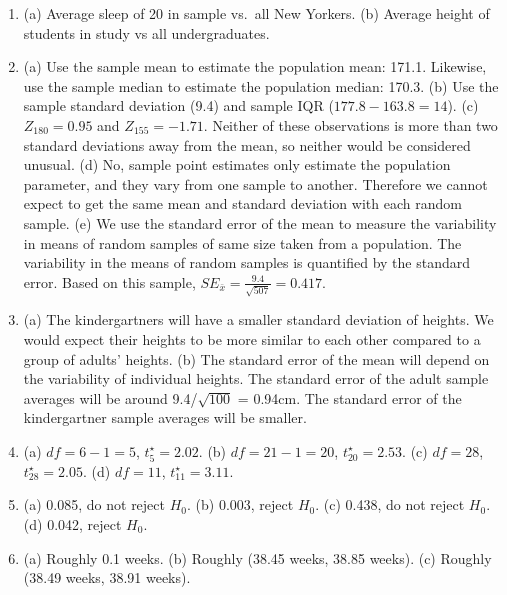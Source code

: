 \documentclass[
  10pt,
  openany]{book}
\providecommand{\tightlist}{%
  \setlength{\itemsep}{0pt}\setlength{\parskip}{0pt}}
\begin{document}
\begin{enumerate}
\def\labelenumi{\arabic{enumi}.}
\tightlist
\item
  (a) Average sleep of 20 in sample vs.~all New Yorkers. (b) Average height of students in study vs all undergraduates.

  \addtocounter{enumi}{1}
\item
  (a) Use the sample mean to estimate the population mean: 171.1. Likewise, use the sample median to estimate the population median: 170.3. (b) Use the sample standard deviation (9.4) and sample IQR (\(177.8-163.8 = 14\)). (c) \(Z_{180} = 0.95\) and \(Z_{155} = -1.71.\) Neither of these observations is more than two standard deviations away from the mean, so neither would be considered unusual. (d) No, sample point estimates only estimate the population parameter, and they vary from one sample to another. Therefore we cannot expect to get the same mean and standard deviation with each random sample. (e) We use the standard error of the mean to measure the variability in means of random samples of same size taken from a population. The variability in the means of random samples is quantified by the standard error. Based on this sample, \(SE_{\bar{x}} = \frac{9.4}{\sqrt{507}} = 0.417.\)

  \addtocounter{enumi}{1}
\item
  (a) The kindergartners will have a smaller standard deviation of heights. We would expect their heights to be more similar to each other compared to a group of adults' heights. (b) The standard error of the mean will depend on the variability of individual heights. The standard error of the adult sample averages will be around 9.4/\(\sqrt{100}\) = 0.94cm. The standard error of the kindergartner sample averages will be smaller.

  \addtocounter{enumi}{1}
\item
  (a) \(df=6-1=5\), \(t_{5}^{\star} = 2.02\). (b) \(df=21-1=20\), \(t_{20}^{\star} = 2.53\). (c) \(df=28\), \(t_{28}^{\star} = 2.05\). (d) \(df=11\), \(t_{11}^{\star} = 3.11\).

  \addtocounter{enumi}{1}
\item
  (a) 0.085, do not reject \(H_0\). (b) 0.003, reject \(H_0\). (c) 0.438, do not reject \(H_0\). (d) 0.042, reject \(H_0\).

  \addtocounter{enumi}{1}
\item
  (a) Roughly 0.1 weeks. (b) Roughly (38.45 weeks, 38.85 weeks). (c) Roughly (38.49 weeks, 38.91 weeks).


\end{enumerate}
\end{document}
